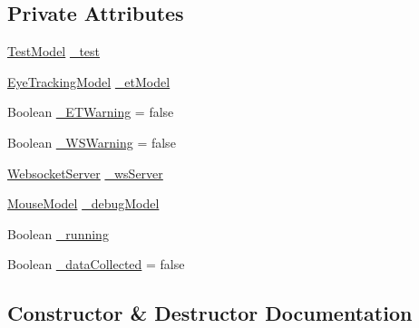 \subsection*{Private Attributes}
\begin{DoxyCompactItemize}
\item 
\hyperlink{class_web_analyzer_1_1_models_1_1_data_model_1_1_test_model}{Test\+Model} \hyperlink{class_web_analyzer_1_1_controller_1_1_test_controller_a6084bcc401d37f7f8861fc0e9fb771b6}{\+\_\+test}
\item 
\hyperlink{class_web_analyzer_1_1_eye_tracking_1_1_eye_tracking_model}{Eye\+Tracking\+Model} \hyperlink{class_web_analyzer_1_1_controller_1_1_test_controller_a0db36e46096d444386af0d357905f430}{\+\_\+et\+Model}
\item 
Boolean \hyperlink{class_web_analyzer_1_1_controller_1_1_test_controller_a33b43014ccf6b9f7cdd1e3136ac19d3a}{\+\_\+\+E\+T\+Warning} = false
\item 
Boolean \hyperlink{class_web_analyzer_1_1_controller_1_1_test_controller_a517bab0ee0c22871788bd498de86c27e}{\+\_\+\+W\+S\+Warning} = false
\item 
\hyperlink{class_web_analyzer_1_1_server_1_1_websocket_server}{Websocket\+Server} \hyperlink{class_web_analyzer_1_1_controller_1_1_test_controller_aeb605e9f2ad9c53af52fb846fe2a98a6}{\+\_\+ws\+Server}
\item 
\hyperlink{class_web_analyzer_1_1_test_1_1_communication_1_1_mouse_model}{Mouse\+Model} \hyperlink{class_web_analyzer_1_1_controller_1_1_test_controller_a1c615e40201210940f07312bcc993ef5}{\+\_\+debug\+Model}
\item 
Boolean \hyperlink{class_web_analyzer_1_1_controller_1_1_test_controller_a49aaaa975ccbeedcd52fb03288cea3ef}{\+\_\+running}
\item 
Boolean \hyperlink{class_web_analyzer_1_1_controller_1_1_test_controller_a7d63bbfba4672d52414c318b397c504b}{\+\_\+data\+Collected} = false
\end{DoxyCompactItemize}


\subsection{Constructor \& Destructor Documentation}
\hypertarget{class_web_analyzer_1_1_controller_1_1_test_controller_acac996dad8f9c1f9890263f82df9593a}{}
